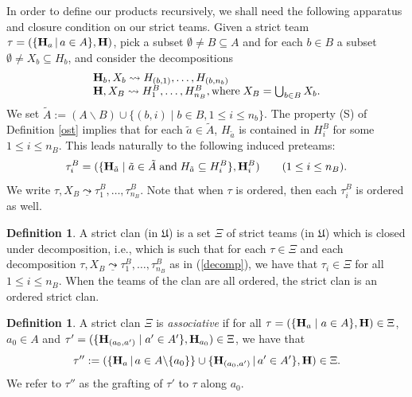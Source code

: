 \documentclass{article}
\theoremstyle{plain}
\theoremstyle{definition}
\newtheorem{definition}[thm]{Definition}
\newcommand{\inc}{\subseteq}
\newcommand{\union}{\cup}
\newcommand{\Union}{\bigcup}
\newcommand{\set}[1]{\{#1\}}
\newcommand{\setc}[2]{\set{#1 \mid #2}}
\newcommand{\hyper}[1]{{\bf #1}}
\newcommand{\clandec}{\underline{\leadsto}}
\begin{document}
In order to define our products recursively, we shall need the following apparatus and closure condition on our strict teams. Given a strict team $\tau=(\{\hyper{H}_a\,|\, a\in A\},\hyper{H})$, 
pick a subset $\emptyset\neq B\subseteq A$ and for each $b\in B$ a subset $\emptyset\neq X_b\subseteq H_b$, and
consider the decompositions
\begin{equation}\begin{array}{l}\hyper{H}_b, X_b \leadsto H_{(b,1)},\ldots ,H_{(b,n_b)}\\
\hyper{H},X_B\leadsto H_1^B,\ldots,H_{n_B}^B, \textrm{where}\; X_B=\Union_{b\in B}X_b.
\end{array}\label{decomp}
\end{equation}
We set
 $\tilde{A}:=(A\backslash B)\union\setc{(b,i)}{b\in B, 1\leq i\leq n_b}$.
 The property (S) of Definition \ref{ost} implies that for each ${\tilde a\in\tilde A}$, $H_{\tilde a}$ is contained in $H_i^B$ for some $1\leq i\leq n_B$.
 This leads naturally to the following induced preteams:
$$\tau_i^B=(\setc{\hyper{H}_{\tilde a}}{\tilde a\in\tilde A\;\textrm{and}\; H_{\tilde a}\inc H_i^B},\hyper{H}_i^B)\quad\quad(1\leq i\leq n_B).$$
We write $\tau, X_B \clandec \tau^B_1,\ldots,\tau^B_{n_B}$.
 Note that when $\tau$ is ordered, then each $\tau^B_i$ is ordered as well.


\begin{definition}
A strict clan (in $\mathfrak{U}$) is a set $\Xi$ of strict teams (in $\mathfrak{U}$) which is closed under decomposition, i.e., which is such that for each $\tau\in\Xi$ and each decomposition $\tau,X_B \clandec \tau^B_1,\ldots,\tau^B_{n_B}$ as in (\ref{decomp}), we have that $\tau_i\in\Xi$ for all $1\leq i\leq n_B$. 
When the teams of the clan are all ordered, the strict clan is an ordered strict clan.
\end{definition}

\begin{definition}
A strict clan $\Xi$ is \emph{associative} if for all $\tau = (\setc{\hyper{H}_a}{a\in A},\hyper{H})\in \Xi$, $a_0\in A$ and
$\tau' = (\setc{\hyper{H}_{(a_0,a')}}{a'\in A'},\hyper{H}_{a_0}) \in\Xi$, we have that
$$\tau'':=(\{{\bf H}_{a}\,|\,a\in A\backslash \{a_0\}\}\cup \{\hyper{H}_{(a_0,a')}\,|\,a'\in A'\},{\bf H})\in\Xi.$$ We refer to $\tau''$ as the grafting of $\tau'$ to $\tau$ along $a_0$.
\end{definition}
 
\end{document}
